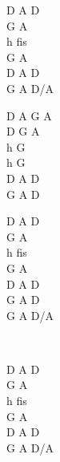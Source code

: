 \begin{chord}
    D A D\\
    G A\\
    h fis\\
    G A\\
    D A D\\
    G A D/A

    D A G A\\
    D G A\\
    h G\\
    h G\\
    D A D\\
    G A D

    D A D\\
    G A\\
    h fis\\
    G A\\
    D A D\\
    G A D\\
    G A D/A

    ~

    D A D\\
    G A\\
    h fis\\
    G A\\
    D A D\\
    G A D/A
\end{chord}